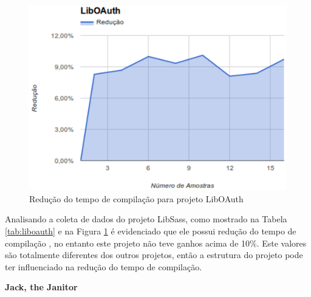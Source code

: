 \begin{figure}[h]
    \centering
        \includegraphics[keepaspectratio=true,scale=1]{figuras/liboauth.eps}
    \caption{Redução do tempo de compilação para projeto LibOAuth}
    \label{liboauth}
\end{figure}
Analisando a coleta de dados do projeto LibSass, como mostrado na Tabela \ref{tab:liboauth} e na Figura \ref{liboauth} é evidenciado que ele possui
 redução do tempo de compilação , no entanto este projeto não teve ganhos
 acima de 10\%. Este valores são totalmente diferentes dos outros projetos,
 então a estrutura do projeto pode ter influenciado na redução do
 tempo de compilação. 

\textbf{Jack, the Janitor}

